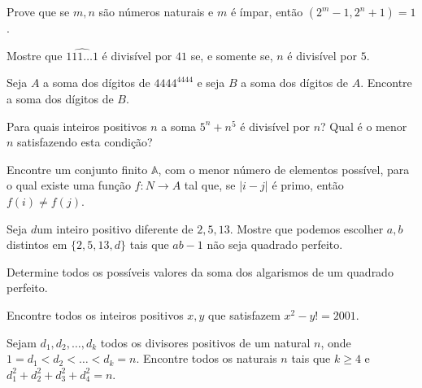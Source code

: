\begin{questao}
  Prove que se $m,n$ são números naturais e $m$ é ímpar,
  então $(2^m-1,2^n+1) = 1$.
\end{questao}

\begin{questao}
  Mostre que $\widehat{111 \ldots 1}$ é divisível por $41$ se, e
  somente se, $n$ é divisível por $5$.
\end{questao}

\begin{questao}
  Seja $A$ a soma dos dígitos de $4444^{4444}$ e seja
  $B$ a soma dos dígitos de $A$. Encontre a soma dos dígitos de
  $B$.

\end{questao}

\begin{questao}
  Para quais inteiros positivos $n$ a soma $5^n+n^5$ é
  divisível por $n$? Qual é o menor $n$ satisfazendo esta condição?
\end{questao}

\begin{questao}
  Encontre um conjunto finito $\mathbb{A}$, com o menor número de
  elementos possível, para o qual existe uma função $f: N \rightarrow
  A$ tal que, se $|i-j|$ é primo, então $f(i) \not = f(j)$.
\end{questao}

\begin{questao}
  Seja $d$um inteiro positivo diferente de
  $2,5,13$. Mostre que podemos escolher $a,b$ distintos em
  $\{2,5,13,d\}$ tais que $ab-1$ não seja quadrado perfeito.

\end{questao}

\begin{questao}
  Determine todos os possíveis valores da soma dos algarismos
  de um quadrado perfeito.

\end{questao}

\begin{questao}
  Encontre todos os inteiros positivos $x,y$ que satisfazem
  $x^2-y!=2001$.

\end{questao}

\begin{questao}
  Sejam $d_1,d_2,\ldots,d_k$ todos os divisores positivos de
  um natural $n$, onde $1=d_1<d_2<\ldots<d_k=n$. Encontre todos os
  naturais $n$ tais que $k \geq 4$ e $d_1^2+d_2^2+d_3^2+d_4^2 = n$.

\end{questao}

